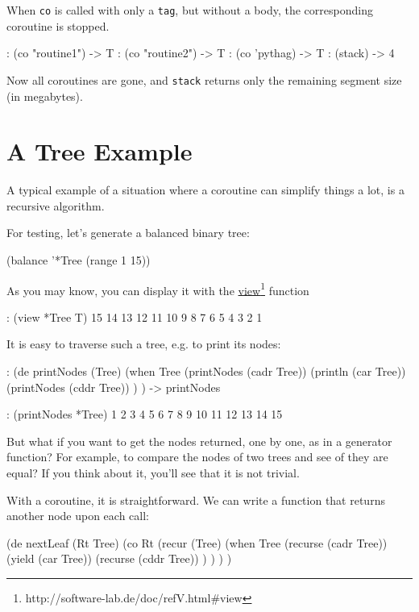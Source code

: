 When \texttt{co} is called with only a \texttt{tag}, but without a body, the corresponding
coroutine is stopped.
\begin{wideverbatim}
   : (co "routine1")
   -> T
   : (co "routine2")
   -> T
   : (co 'pythag)
   -> T
   : (stack)
   -> 4
\end{wideverbatim}

Now all coroutines are gone, and \texttt{stack} returns only the remaining segment
size (in megabytes).

\section{A Tree Example}
\label{sec:coroutines-a-tree-example}

A typical example of a situation where a coroutine can simplify things a lot, is
a recursive algorithm.

For testing, let's generate a balanced binary tree:
\begin{wideverbatim}
   (balance '*Tree (range 1 15))
\end{wideverbatim}

As you may know, you can display it with the
\underline{view}\footnote{http://software-lab.de/doc/refV.html\#view} function
\begin{wideverbatim}
   : (view *Tree T)
            15
         14
            13
      12
            11
         10
            9
   8
            7
         6
            5
      4
            3
         2
            1
\end{wideverbatim}

It is easy to traverse such a tree, e.g. to print its nodes:
\begin{wideverbatim}
   : (de printNodes (Tree)
      (when Tree
         (printNodes (cadr Tree))
         (println (car Tree))
         (printNodes (cddr Tree)) ) )
   -> printNodes

   : (printNodes *Tree)
   1
   2
   3
   4
   5
   6
   7
   8
   9
   10
   11
   12
   13
   14
   15
\end{wideverbatim}

But what if you want to get the nodes returned, one by one, as in a generator
function? For example, to compare the nodes of two trees and see of they are
equal? If you think about it, you'll see that it is not trivial.

With a coroutine, it is straightforward. We can write a function that returns
another node upon each call:
\begin{wideverbatim}
   (de nextLeaf (Rt Tree)
      (co Rt
         (recur (Tree)
            (when Tree
               (recurse (cadr Tree))
               (yield (car Tree))
               (recurse (cddr Tree)) ) ) ) )
\end{wideverbatim}

